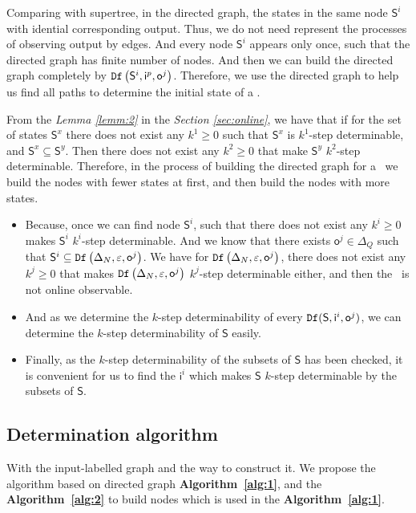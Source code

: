 Comparing with supertree, in the directed graph, the states in the same node $\mathsf{S}^i$ with idential corresponding output. Thus, we do not need represent the processes of observing output by edges. And every node $\mathsf{S}^i$ appears only once, such that the directed graph has finite number of nodes. And then we can build the directed graph completely by ${\tt Df}\left(\mathsf{S}^i,\mathsf{i}^{p},\mathsf{o}^{j}\right)$. Therefore, we use the directed graph to help us find all paths to determine the initial state of a \BCN.

From the {\em Lemma \ref{lemm:2}} in the {\em Section \ref{sec:online}}, we have that if for the set of states $\mathsf{S}^x$ there does not exist any $k^{1}\ge 0$ such that $\mathsf{S}^{x}$ is $k^{1}$-step determinable, and $\mathsf{S}^{x}\subseteq \mathsf{S}^{y}$. Then there does not exist any $k^{2}\ge 0$ that make $\mathsf{S}^{y}$ $k^{2}$-step determinable. Therefore, in the process of building the directed graph for a \BCN\ we build the nodes with fewer states at first, and then build the nodes with more states.
\begin{itemize}
\item  Because, once we can find node $\mathsf{S}^i$, such that there does not exist any $k^{i}\ge0$ makes $\mathsf{S}^{i}$ $k^{i}$-step determinable. And we know that there exists $\mathsf{o}^{j}\in \Delta_Q$ such that $\mathsf{S}^{i}\subseteq {\tt Df}\left(\Delta_N,\varepsilon, \mathsf{o}^{j}\right)$. We have for ${\tt Df}\left(\Delta_N,\varepsilon, \mathsf{o}^{j}\right)$, there does not exist any $k^{j}\ge 0$ that makes  ${\tt Df}\left(\Delta_N,\varepsilon, \mathsf{o}^{j}\right)$ $k^{j}$-step determinable either, and then the \BCN\ is not online observable.
\item And as we determine the $k$-step determinability of every ${\tt Df}(\mathsf{S},\mathsf{i}^{i},\mathsf{o}^{j})$, we can determine the $k$-step determinability of $\mathsf{S}$ easily.
\item  Finally, as the $k$-step determinability of the subsets of $\mathsf{S}$ has been checked, it is convenient for us to find the $\mathsf{i}^{i}$ which makes $\mathsf{S}$ $k$-step determinable by the subsets of $\mathsf{S}$.
 \end{itemize}
 \subsection{Determination algorithm}
With the input-labelled graph and the way to construct it. We propose the algorithm based on directed graph {\bf Algorithm~\ref{alg:1}}, and the {\bf Algorithm~\ref{alg:2}} to build nodes which is used in the {\bf Algorithm~\ref{alg:1}}.

